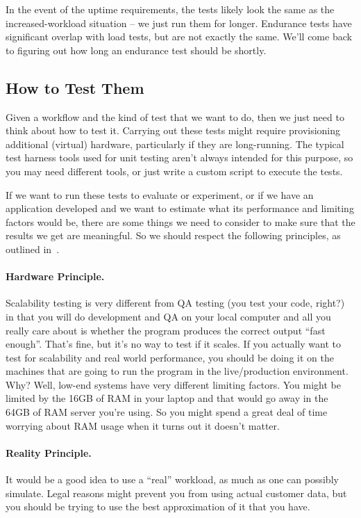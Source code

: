 In the event of the uptime requirements, the tests likely look the same as the increased-workload situation -- we just run them for longer. Endurance tests have significant overlap with load tests, but are not exactly the same. We'll come back to figuring out how long an endurance test should be shortly.


\subsection*{How to Test Them}

Given a workflow and the kind of test that we want to do, then we just need to think about how to test it. Carrying out these tests might require provisioning additional (virtual) hardware, particularly if they are long-running. The typical test harness tools used for unit testing aren't always intended for this purpose, so you may need different tools, or just write a custom script to execute the tests.

If we want to run these tests to evaluate or experiment, or if we have an application developed and we want to estimate what its performance and limiting factors would be, there are some things we need to consider to make sure that the results we get are meaningful.  So we should respect the following principles, as outlined in~\cite{swps}.


\paragraph{Hardware Principle.} 
Scalability testing is very different from  QA testing (you test your code, right?) in that you will do development and QA on your local computer and all you really care about is whether the program produces the correct output ``fast enough''. That's fine, but it's no way to test if it scales. If you actually want to test for scalability and real world performance, you should be doing it on the machines that are going to run the program in the live/production environment. Why? Well, low-end systems have very different limiting factors. You might be limited by the 16GB of RAM in your laptop and that would go away in the 64GB of RAM server you're using. So you might spend a great deal of time worrying about RAM usage when it turns out it doesn't matter.

\paragraph{Reality Principle.}
It would be a good idea to use a ``real'' workload, as much as one can possibly simulate. Legal reasons might prevent you from using actual customer data, but you should be trying to use the best approximation of it that you have. 

